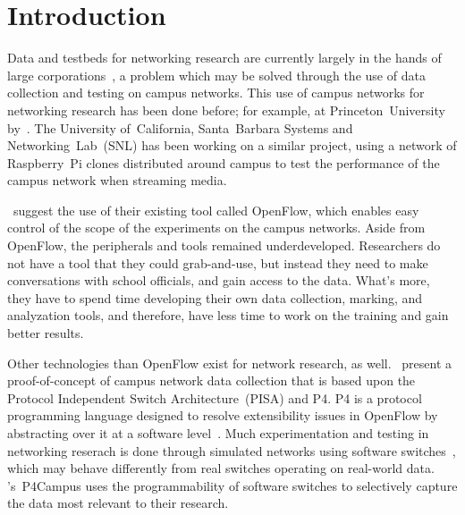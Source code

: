 \section{Introduction}\label{introduction}
    Data and testbeds for networking research are currently largely in the hands of large corporations~\autocite{GuptaArpit2019AEtD}, a problem which may be solved through the use of data collection and testing on campus networks. This use of campus networks for networking research has been done before; for example, at Princeton~University by~\textcite{KimHyojoon2021Erop}. The University of~California, Santa~Barbara Systems and Networking~Lab~(SNL) has been working on a similar project, using a network of Raspberry~Pi clones distributed around campus to test the performance of the campus network when streaming media.

    \Textcite{10.1145/1355734.1355746}~suggest the use of their existing tool called OpenFlow, which enables easy control of the scope of the experiments on the campus networks. Aside from OpenFlow, the peripherals and tools remained underdeveloped. Researchers do not have a tool that they could grab-and-use, but instead they need to make conversations with school officials, and gain access to the data. What's more, they have to spend time developing their own data collection, marking, and analyzation tools, and therefore, have less time to work on the training and gain better results.

    Other technologies than OpenFlow exist for network research, as well. \Textcite{KimHyojoon2021Erop}~present a proof-of-concept of campus network data collection that is based upon the Protocol Independent Switch Architecture~(PISA) and P4.
    P4 is a protocol programming language designed to resolve extensibility issues in OpenFlow by abstracting over it at a software level~\autocite{BosshartPat2014Pppp}. Much experimentation and testing in networking reserach is done through simulated networks using software switches~\autocite{KimHyojoon2021Erop}, which may behave differently from real switches operating on real-world data. \Textcite*{KimHyojoon2021Erop}'s~P4Campus uses the programmability of software switches to selectively capture the data most relevant to their research.
